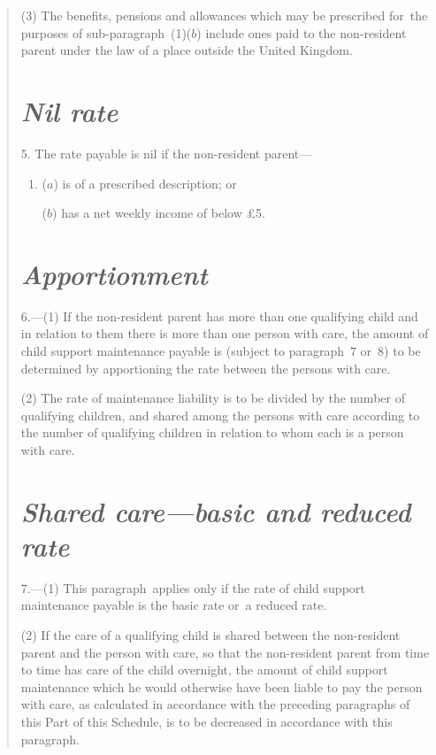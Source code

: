 \documentclass[12pt,a4paper]{article}
\begin{document}
\begin{quotation}
(3) The benefits, pensions and allowances which may be prescribed for~the purposes of sub-paragraph~(1)($b$)  include ones paid to the non-resident parent under the law of a place outside the United Kingdom.

\section*{\itshape Nil rate}

5. The rate payable is nil if the non-resident parent—
\begin{enumerate}\item[]
($a$) is of a prescribed description; or

($b$) has a net weekly income of below £5. 
\end{enumerate}

\section*{\itshape Apportionment}

6.---(1) If the non-resident parent has more than one qualifying child and in relation to them there is more than one person with care, the amount of child support maintenance payable is (subject to paragraph~7 or~8) to be determined by apportioning the rate between the persons with care.

(2) The rate of maintenance liability is to be divided by the number of qualifying children, and shared among the persons with care according to the number of qualifying children in relation to whom each is a person with care.

\section*{\itshape Shared care—basic and reduced rate}

7.---(1) This paragraph~applies only if the rate of child support maintenance payable is the basic rate or~a reduced rate.

(2) If the care of a qualifying child is shared between the non-resident parent and the person with care, so that the non-resident parent from time to time has care of the child overnight, the amount of child support maintenance which he would otherwise have been liable to pay the person with care, as calculated in accordance with the preceding paragraphs of this Part of this Schedule, is to be decreased in accordance with this paragraph.


\end{quotation}
\end{document}
